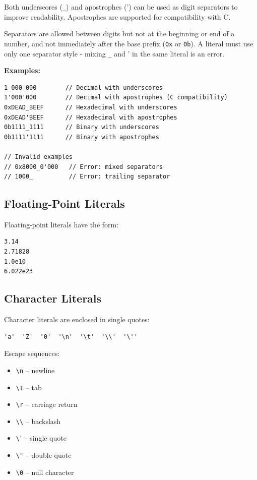 \documentclass[11pt,letterpaper,twoside,openany]{book}
\begin{document}
Both underscores (\verb'_') and apostrophes (\verb''') can be used as digit separators to improve readability. Apostrophes are supported for compatibility with C.

Separators are allowed between digits but not at the beginning or end of a number, and not immediately after the base prefix (\verb'0x' or \verb'0b'). A literal must use only one separator style - mixing \verb'_' and \verb''' in the same literal is an error.

\textbf{Examples:}
\begin{lstlisting}
1_000_000        // Decimal with underscores
1'000'000        // Decimal with apostrophes (C compatibility)
0xDEAD_BEEF      // Hexadecimal with underscores
0xDEAD'BEEF      // Hexadecimal with apostrophes
0b1111_1111      // Binary with underscores
0b1111'1111      // Binary with apostrophes

// Invalid examples
// 0x8000_0'000   // Error: mixed separators
// 1000_          // Error: trailing separator
\end{lstlisting}

\subsection{Floating-Point Literals}
Floating-point literals have the form:
\begin{lstlisting}
3.14
2.71828
1.0e10
6.022e23
\end{lstlisting}

\subsection{Character Literals}
Character literals are enclosed in single quotes:
\begin{lstlisting}
'a'  'Z'  '0'  '\n'  '\t'  '\\'  '\''
\end{lstlisting}

Escape sequences:
\begin{itemize}
\item \verb'\n' -- newline
\item \verb'\t' -- tab
\item \verb'\r' -- carriage return
\item \verb'\\' -- backslash
\item \verb'\'' -- single quote
\item \verb'\"' -- double quote
\item \verb'\0' -- null character
\end{itemize}
\end{document}

